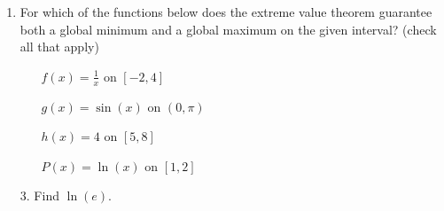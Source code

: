 \documentclass[11pt]{article}
\begin{document}
\pagestyle{empty}
\newsavebox{\quizfront}
\begin{lrbox}{\quizfront}
\begin{minipage}[top][4.5in][t]{\textwidth} \setlength{\parindent}{1.5em}
\drawtitle
\vspace{-0.5in}
\begin{enumerate}

\item For which of the functions below does the extreme value theorem
guarantee both a global minimum and a global maximum on the given interval?
(check all that apply)

\vfill

\begin{enumerate}
  \item[\textbigcircle] $f(x)=\frac{1}{x}$ on $[-2,4]$
  \item[\textbigcircle] $g(x)=\sin(x)$ on $(0,\pi)$
  \item[\textbigcircle] $h(x)=4$ on $[5,8]$
  \item[\textbigcircle] $P(x)=\ln(x)$ on $[1,2]$
\end{enumerate}
  \vfill


\end{enumerate}



\end{minipage}
\end{lrbox}

\newsavebox{\quizback}
\begin{lrbox}{\quizback}
\begin{minipage}[top][4.5in][t]{\textwidth} \setlength{\parindent}{1.5em}
\begin{itemize}
 \item[3.] Find $\ln(e)$. 


\end{itemize}
\end{minipage}
\end{lrbox}

\noindent \usebox{\quizfront}
\vfill
\noindent \usebox{\quizfront}

\end{document}
